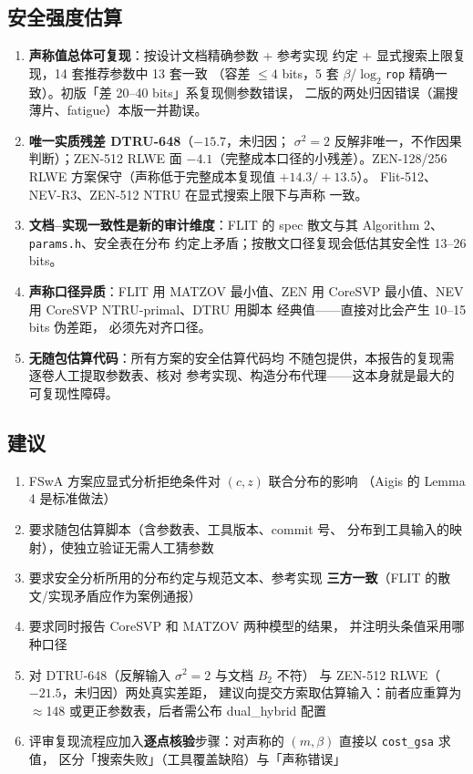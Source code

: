 \documentclass[11pt,a4paper]{ctexart}
\begin{document}
\subsection{安全强度估算}

\begin{enumerate}
\item \textbf{声称值总体可复现}：按设计文档精确参数 + 参考实现
      约定 + 显式搜索上限复现，14 套推荐参数中 13 套一致
      （容差 $\le 4$ bits，5 套 $\beta$/$\log_2$\texttt{rop}
      精确一致）。初版「差 20--40 bits」系复现侧参数错误，
      二版的两处归因错误（漏搜薄片、fatigue）本版一并勘误。
\item \textbf{唯一实质残差 DTRU-648}（$-15.7$，未归因；
      $\sigma^2{=}2$ 反解非唯一，不作因果判断）；ZEN-512 RLWE
      面 $-4.1$（完整成本口径的小残差）。ZEN-128/256 RLWE
      方案保守（声称低于完整成本复现值 $+14.3/+13.5$）。
      Flit-512、NEV-R3、ZEN-512 NTRU 在显式搜索上限下与声称
      一致。
\item \textbf{文档--实现一致性是新的审计维度}：FLIT 的 spec
      散文与其 Algorithm 2、\texttt{params.h}、安全表在分布
      约定上矛盾；按散文口径复现会低估其安全性 13--26 bits。
\item \textbf{声称口径异质}：FLIT 用 MATZOV 最小值、ZEN 用
      CoreSVP 最小值、NEV 用 CoreSVP NTRU-primal、DTRU 用脚本
      经典值——直接对比会产生 10--15 bits 伪差距，
      必须先对齐口径。
\item \textbf{无随包估算代码}：所有方案的安全估算代码均
      不随包提供，本报告的复现需逐卷人工提取参数表、核对
      参考实现、构造分布代理——这本身就是最大的可复现性障碍。
\end{enumerate}

\subsection{建议}

\begin{enumerate}
\item FSwA 方案应显式分析拒绝条件对 $(c,z)$ 联合分布的影响
      （Aigis 的 Lemma 4 是标准做法）
\item 要求随包估算脚本（含参数表、工具版本、commit 号、
      分布到工具输入的映射），使独立验证无需人工猜参数
\item 要求安全分析所用的分布约定与规范文本、参考实现
      \textbf{三方一致}（FLIT 的散文/实现矛盾应作为案例通报）
\item 要求同时报告 CoreSVP 和 MATZOV 两种模型的结果，
      并注明头条值采用哪种口径
\item 对 DTRU-648（反解输入 $\sigma^2{=}2$ 与文档 $B_2$ 不符）
      与 ZEN-512 RLWE（$-21.5$，未归因）两处真实差距，
      建议向提交方索取估算输入：前者应重算为 $\approx$148
      或更正参数表，后者需公布 dual\_hybrid 配置
\item 评审复现流程应加入\textbf{逐点核验}步骤：对声称的
      $(m,\beta)$ 直接以 \texttt{cost\_gsa} 求值，
      区分「搜索失败」（工具覆盖缺陷）与「声称错误」
\end{enumerate}
\end{document}
